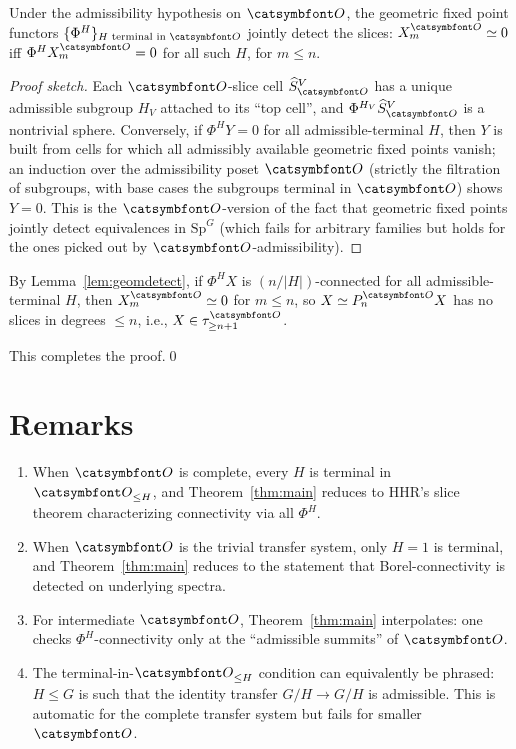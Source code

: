 \begin{lemma}\label{lem:geomdetect}
Under the admissibility hypothesis on $\aO$, the geometric fixed point functors $\{\Phi^H\}_{H\text{ terminal in }\aO}$ jointly detect the slices: $X^\aO_m \simeq 0$ iff $\Phi^H X^\aO_m = 0$ for all such $H$, for $m\leq n$.
\end{lemma}

\begin{proof}[Proof sketch]
Each $\aO$-slice cell $\widehat S^V_\aO$ has a unique admissible subgroup $H_V$ attached to its ``top cell'', and $\Phi^{H_V} \widehat S^V_\aO$ is a nontrivial sphere. Conversely, if $\Phi^H Y=0$ for all admissible-terminal $H$, then $Y$ is built from cells for which all admissibly available geometric fixed points vanish; an induction over the admissibility poset $\aO$ (strictly the filtration of subgroups, with base cases the subgroups terminal in $\aO$) shows $Y=0$. This is the $\aO$-version of the fact that geometric fixed points jointly detect equivalences in $\mathrm{Sp}^G$ (which fails for arbitrary families but holds for the ones picked out by $\aO$-admissibility).
\end{proof}

By Lemma~\ref{lem:geomdetect}, if $\Phi^H X$ is $(n/|H|)$-connected for all admissible-terminal $H$, then $X^\aO_m \simeq 0$ for $m\leq n$, so $X\simeq P^\aO_n X$ has no slices in degrees $\leq n$, i.e., $X\in\tau^\aO_{\geq n+1}$.

This completes the proof.\qed

\section{Remarks}

\begin{enumerate}
\item When $\aO$ is complete, every $H$ is terminal in $\aO_{\leq H}$, and Theorem~\ref{thm:main} reduces to HHR's slice theorem characterizing connectivity via all $\Phi^H$.
\item When $\aO$ is the trivial transfer system, only $H=1$ is terminal, and Theorem~\ref{thm:main} reduces to the statement that Borel-connectivity is detected on underlying spectra.
\item For intermediate $\aO$, Theorem~\ref{thm:main} interpolates: one checks $\Phi^H$-connectivity only at the ``admissible summits'' of $\aO$.
\item The terminal-in-$\aO_{\leq H}$ condition can equivalently be phrased: $H\leq G$ is such that the identity transfer $G/H\to G/H$ is admissible. This is automatic for the complete transfer system but fails for smaller $\aO$.
\end{enumerate}

